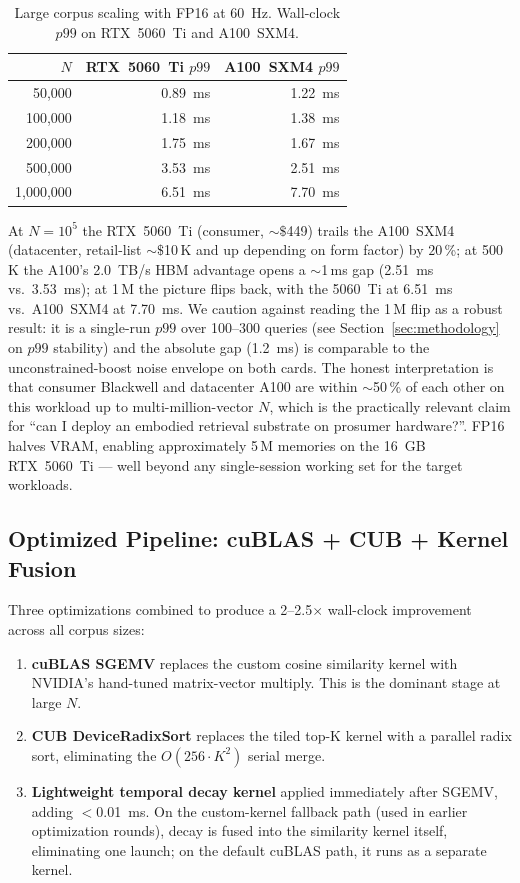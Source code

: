 \documentclass[11pt]{article}
\begin{document}
\begin{table}[ht]
\centering
\small
\caption{Large corpus scaling with FP16 at 60~Hz.
Wall-clock $p99$ on RTX~5060~Ti and A100~SXM4.}
\label{tab:large_scaling}
\begin{tabular}{rrr}
\toprule
\textbf{$N$} & \textbf{RTX~5060~Ti $p99$} & \textbf{A100~SXM4 $p99$} \\
\midrule
  50{,}000 & 0.89~ms & 1.22~ms \\
 100{,}000 & 1.18~ms & 1.38~ms \\
 200{,}000 & 1.75~ms & 1.67~ms \\
 500{,}000 & 3.53~ms & 2.51~ms \\
1{,}000{,}000 & 6.51~ms & 7.70~ms \\
\bottomrule
\end{tabular}
\end{table}

At $N{=}10^5$ the RTX~5060~Ti (consumer, ${\sim}\$$449) trails the
A100~SXM4 (datacenter, retail-list ${\sim}\$$10\,K and up depending
on form factor) by $20\,$\%; at 500\,K the A100's 2.0~TB/s HBM
advantage opens a $\sim$1\,ms gap (2.51~ms vs.\ 3.53~ms); at 1\,M
the picture flips back, with the 5060~Ti at 6.51~ms vs.\ A100~SXM4
at 7.70~ms. We caution against reading the 1\,M flip as a robust
result: it is a single-run $p99$ over 100--300 queries (see
Section~\ref{sec:methodology} on $p99$ stability) and the absolute
gap (1.2~ms) is comparable to the unconstrained-boost noise envelope
on both cards. The honest interpretation is that consumer Blackwell
and datacenter A100 are within $\sim$50\,\% of each other on this
workload up to multi-million-vector $N$, which is the practically
relevant claim for ``can I deploy an embodied retrieval substrate on
prosumer hardware?''. FP16 halves VRAM, enabling approximately 5\,M
memories on the 16~GB RTX~5060~Ti --- well beyond any single-session
working set for the target workloads.

\subsection{Optimized Pipeline: cuBLAS + CUB + Kernel Fusion}
\label{sec:optimized_pipeline}

Three optimizations combined to produce a 2--2.5$\times$ wall-clock
improvement across all corpus sizes:

\begin{enumerate}
\item \textbf{cuBLAS SGEMV} replaces the custom cosine similarity kernel
  with NVIDIA's hand-tuned matrix-vector multiply. This is the dominant
  stage at large $N$.
\item \textbf{CUB DeviceRadixSort} replaces the tiled top-K kernel with
  a parallel radix sort, eliminating the $O(256 \cdot K^2)$ serial merge.
\item \textbf{Lightweight temporal decay kernel} applied immediately
  after SGEMV, adding $<$0.01~ms. On the custom-kernel fallback path
  (used in earlier optimization rounds), decay is fused into the
  similarity kernel itself, eliminating one launch; on the default
  cuBLAS path, it runs as a separate kernel.
\end{enumerate}
\end{document}
